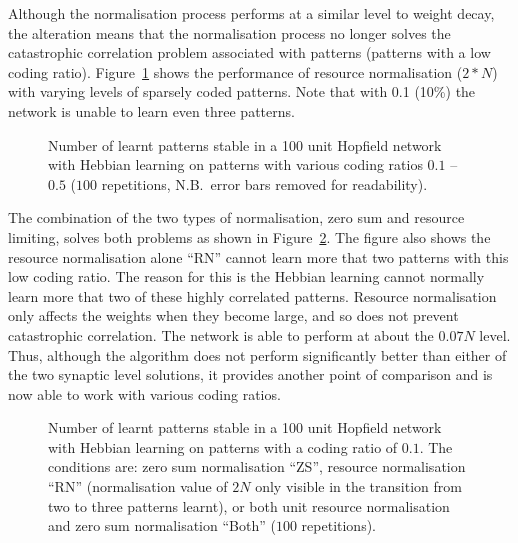 Although the normalisation process performs at a similar level to weight decay, the alteration means that the normalisation process no longer solves the catastrophic correlation problem associated with  patterns (patterns with a low coding ratio). Figure~\ref{fig:WeightNormRComp} shows the performance of resource normalisation ($2*N$) with varying levels of sparsely coded patterns. Note that with 0.1 (10\%) the network is unable to learn even three patterns.

\begin{figure}[tbp]
\small
\center
		 
	\caption{Number of learnt patterns stable in a 100 unit Hopfield network  with Hebbian learning on patterns with various coding ratios $0.1$ -- $0.5$ ($100$ repetitions, N.B.\ error bars removed for readability).}
	\label{fig:WeightNormRComp}
\end{figure}  

The combination of the two types of normalisation, zero sum and resource limiting, solves both problems as shown in Figure~\ref{fig:WeightNormBoth100num}.  The figure also shows the resource normalisation alone ``RN'' cannot learn more that two patterns with this low coding ratio.  The reason for this is the Hebbian learning cannot normally learn more that two of these highly correlated patterns.  Resource normalisation only affects the weights when they become large, and so does not prevent catastrophic correlation. The network is able to perform at about the $0.07N$ level. Thus, although the algorithm does not perform significantly better than either of the two synaptic level solutions, it provides another point of comparison and is now able to work with various coding ratios.  

\begin{figure}[tbp]
\small
\center
	\scalebox{0.95}{}
	\caption{Number of learnt patterns stable in a 100 unit Hopfield network  with Hebbian learning on patterns with a coding ratio of $0.1$.  The conditions are:  zero sum normalisation ``ZS'', resource normalisation ``RN'' (normalisation value of $2N$ only visible in the transition from two to three patterns learnt), or  both unit resource normalisation and zero sum normalisation ``Both'' ($100$ repetitions).}
	\label{fig:WeightNormBoth100num}
\end{figure}  

